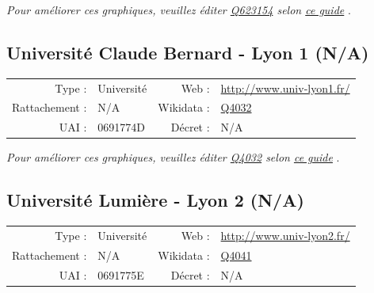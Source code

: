 \documentclass[12pt,french,landscape]{article}
\begin{document}
\textit{\scriptsize Pour améliorer ces graphiques, veuillez éditer \href{https://www.wikidata.org/entity/Q623154}{Q623154}  selon \href{https://github.com/cpesr/wikidataESR/blob/master/Rmd/wikidataESR.md}{ce guide}}
.


\newpage

\hypertarget{universituxe9-claude-bernard---lyon-1-na}{%
\subsection{Université Claude Bernard - Lyon 1
(N/A)}\label{universituxe9-claude-bernard---lyon-1-na}}

\begin{tabular*}{0.45\textwidth}{rp{2cm}rl}  
\hline  
Type : & Université & Web : &\href{http://www.univ-lyon1.fr/}{http://www.univ-lyon1.fr/} \\  
Rattachement : & N/A & Wikidata : & \href{https://www.wikidata.org/entity/Q4032}{Q4032} \\  
UAI : & 0691774D & Décret : & N/A \\  
\hline  
\end{tabular*}

\textit{\scriptsize Pour améliorer ces graphiques, veuillez éditer \href{https://www.wikidata.org/entity/Q4032}{Q4032}  selon \href{https://github.com/cpesr/wikidataESR/blob/master/Rmd/wikidataESR.md}{ce guide}}
.


\newpage

\hypertarget{universituxe9-lumiuxe8re---lyon-2-na}{%
\subsection{Université Lumière - Lyon 2
(N/A)}\label{universituxe9-lumiuxe8re---lyon-2-na}}

\begin{tabular*}{0.45\textwidth}{rp{2cm}rl}  
\hline  
Type : & Université & Web : &\href{http://www.univ-lyon2.fr/}{http://www.univ-lyon2.fr/} \\  
Rattachement : & N/A & Wikidata : & \href{https://www.wikidata.org/entity/Q4041}{Q4041} \\  
UAI : & 0691775E & Décret : & N/A \\  
\hline  
\end{tabular*}
\end{document}
